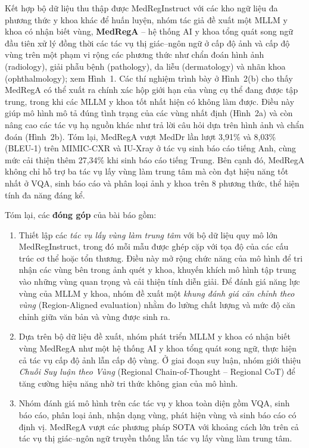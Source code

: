 \documentclass[12pt,a4paper,oneside]{extarticle}
\begin{document}
Kết hợp bộ dữ liệu thu thập được MedRegInstruct với các kho ngữ liệu đa phương thức y khoa khác
để huấn luyện, nhóm tác giả đề xuất một MLLM y khoa có nhận biết vùng, \textbf{MedRegA} -- hệ
thống AI y khoa tổng quát song ngữ đầu tiên xử lý đồng thời các tác vụ thị giác--ngôn ngữ ở cấp
độ ảnh và cấp độ vùng trên một phạm vi rộng các phương thức như chẩn đoán hình ảnh (radiology),
giải phẫu bệnh (pathology), da liễu (dermatology) và nhãn khoa (ophthalmology); xem Hình~1. Các
thí nghiệm trình bày ở Hình~2(b) cho thấy MedRegA có thể xuất ra chính xác hộp giới hạn của vùng
cụ thể đang được tập trung, trong khi các MLLM y khoa tốt nhất hiện có không làm được. Điều này
giúp mô hình mô tả đúng tình trạng của các vùng nhất định (Hình~2a) và còn nâng cao các tác vụ
hạ nguồn khác như trả lời câu hỏi dựa trên hình ảnh và chẩn đoán (Hình~2b). Tóm lại, MedRegA
vượt MedDr lần lượt 3,91\% và 8,03\% (BLEU-1) trên MIMIC-CXR và IU-Xray ở tác vụ sinh báo cáo
tiếng Anh, cùng mức cải thiện thêm 27,34\% khi sinh báo cáo tiếng Trung. Bên cạnh đó, MedRegA
không chỉ hỗ trợ ba tác vụ lấy vùng làm trung tâm mà còn đạt hiệu năng tốt nhất ở VQA, sinh báo
cáo và phân loại ảnh y khoa trên 8 phương thức, thể hiện tính đa năng đáng kể.

Tóm lại, các \textbf{đóng góp} của bài báo gồm:
\begin{enumerate}
  \item Thiết lập các \emph{tác vụ lấy vùng làm trung tâm} với bộ dữ liệu quy mô lớn
  MedRegInstruct, trong đó mỗi mẫu được ghép cặp với tọa độ của các cấu trúc cơ thể hoặc tổn
  thương. Điều này mở rộng chức năng của mô hình để tri nhận các vùng bên trong ảnh quét y khoa,
  khuyến khích mô hình tập trung vào những vùng quan trọng và cải thiện tính diễn giải. Để
  đánh giá năng lực vùng của MLLM y khoa, nhóm đề xuất một \emph{khung đánh giá căn chỉnh theo
  vùng} (Region-Aligned evaluation) nhằm đo lường chất lượng và mức độ căn chỉnh giữa văn bản
  và vùng được sinh ra.
  \item Dựa trên bộ dữ liệu đề xuất, nhóm phát triển MLLM y khoa có nhận biết vùng MedRegA như
  một hệ thống AI y khoa tổng quát song ngữ, thực hiện cả tác vụ cấp độ ảnh lẫn cấp độ vùng. Ở
  giai đoạn suy luận, nhóm giới thiệu \emph{Chuỗi Suy luận theo Vùng} (Regional Chain-of-Thought
  -- Regional CoT) để tăng cường hiệu năng nhờ tri thức không gian của mô hình.
  \item Nhóm đánh giá mô hình trên các tác vụ y khoa toàn diện gồm VQA, sinh báo cáo, phân loại
  ảnh, nhận dạng vùng, phát hiện vùng và sinh báo cáo có định vị. MedRegA vượt các phương pháp
  SOTA với khoảng cách lớn trên cả tác vụ thị giác--ngôn ngữ truyền thống lẫn tác vụ lấy vùng
  làm trung tâm.
\end{enumerate}
\end{document}
